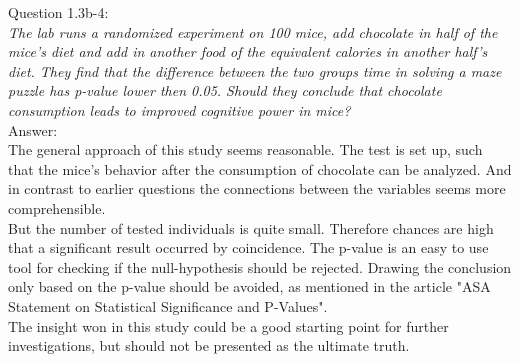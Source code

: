 
Question 1.3b-4:\\	
\textsl{The lab runs a randomized experiment on 100 mice, add chocolate in half of the mice's diet and add in another food of the equivalent calories in another half's diet. They find that the difference between the two groups time in solving a maze puzzle has p-value lower then 0.05. Should they conclude that chocolate consumption leads to improved cognitive power in mice?}\\

Answer:\\
The general approach of this study seems reasonable. The test is set up, such that the mice's behavior after the consumption of chocolate can be analyzed. And in contrast to earlier questions the connections between the variables seems more comprehensible.\\

But the number of tested individuals is quite small. Therefore chances are high that a significant result occurred by coincidence. The p-value is an easy to use tool for checking if the null-hypothesis should be rejected. Drawing the conclusion only based on the p-value should be avoided, as mentioned in the article "ASA Statement on Statistical Significance and P-Values".\\

The insight won in this study could be a good starting point for further investigations, but should not be presented as the ultimate truth.\\
